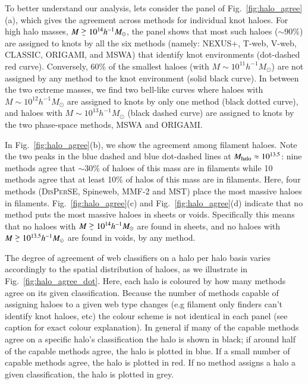\documentclass[useAMS,usenatbib]{mnras}
\def\gsim{\mathrel{\lower0.6ex\hbox{$\buildrel {\textstyle >}
 \over {\scriptstyle \sim}$}}}
\newcommand{\mcd}[1]{\textcolor{red}{\sout{  #1}}}
\newcommand{\classic}{\textsc{CLASSIC}}
\newcommand{\disperse}{\textsc{DisPerSE}}
\newcommand{\origami}{\textsc{ORIGAMI}}
\newcommand{\mst}{\textsc{MST}}
\newcommand{\nexus}{\textsc{NEXUS+}}
\newcommand{\tweb}{T-web}
\newcommand{\vweb}{V-web}
\newcommand{\mswa}{\textsc{MSWA}}
\newcommand{\mmft}{\textsc{MMF-2}}
\newcommand{\spine}{Spineweb}
\begin{document}
To better understand our analysis, lets consider the panel of Fig.~\ref{fig:halo_agree}(a), which gives the agreement across methods for individual knot haloes. For high halo masses, $M\gsim10^{14}h^{-1}M_{\odot}$, the panel shows that most such haloes ($\sim90\%$) are assigned to knots by all the six methods (namely: \nexus{}, \tweb{}, \vweb{}, \classic{}, \origami{}, and \mswa{}) that identify knot environments (dot-dashed red curve). Conversely, 60\% of the smallest haloes (with $M\sim10^{11}h^{-1}M_{\odot}$) are not assigned by any method to the knot environment (solid black curve). In between the two extreme masses, we find two bell-like curves where haloes with $M\sim10^{12}h^{-1}M_{\odot}$ are assigned to knots by only one method (black dotted curve), and haloes with $M\sim10^{13}h^{-1}M_{\odot}$ (black dashed curve) are assigned to knots by the two phase-space methods, \mswa{} and \origami{}.

In Fig.~\ref{fig:halo_agree}(b), we show the agreement among filament haloes. Note the two peaks in the blue dashed and blue dot-dashed lines at $M_{\rm halo}\approx 10^{13.5}$: nine methods agree that $\sim30\%$ of haloes of this mass are in filaments while 10 methods agree that at least 10\% of halos of this mass are in filaments. Here, four methods (\disperse{}, \spine{}, \mmft{} and \mst{}) place the most massive haloes in filaments. Fig.~\ref{fig:halo_agree}(c) and Fig.~\ref{fig:halo_agree}(d) indicate that no method puts the most massive haloes in sheets or voids. Specifically this means that no haloes with $M\gsim10^{14}h^{-1}M_{\odot}$ are found in sheets, and no haloes with $M\gsim10^{13.5}h^{-1}M_{\odot}$ are found in voids, by any method. 



The degree of agreement of web classifiers on a halo per halo basis varies accordingly to the spatial distribution of haloes, as we illustrate in Fig.~\ref{fig:halo_agree_dot}. Here, each halo is coloured by how many methods agree on its given classification. Because the number of methods capable of assigning haloes to a given web type changes (e.g filament only finders can't identify knot haloes, etc) the colour scheme is not identical in each panel (see caption for exact colour explanation). In general if many of the capable methods agree on a specific halo's classification the halo is shown in black; if around half of the capable methods agree, the halo is plotted in blue. If a small number of capable methods agree, the halo is plotted in red. If no method assigns a halo a given classification, the halo is plotted in grey.
\end{document}
